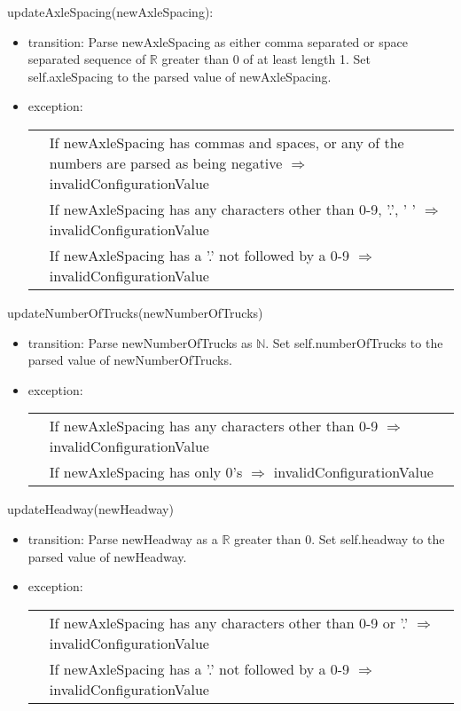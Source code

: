 \documentclass[12pt, titlepage]{article}
\begin{document}
\noindent updateAxleSpacing(newAxleSpacing):
\begin{itemize}
\item transition: Parse newAxleSpacing as either comma separated or space separated sequence of $\mathbb{R}$ greater than 0 of at least length 1. Set self.axleSpacing to the parsed value of newAxleSpacing.
\item exception:\\
  \begin{tabular}{p{1cm} p{16.3cm}}
    & If newAxleSpacing has commas and spaces, or any of the numbers are parsed as being negative $\Rightarrow$ invalidConfigurationValue \\
    & If newAxleSpacing has any characters other than 0-9, '.', ' ' $\Rightarrow$ invalidConfigurationValue \\
    & If newAxleSpacing has a '.' not followed by a 0-9 $\Rightarrow$ invalidConfigurationValue \\
  \end{tabular}
\end{itemize}

\noindent updateNumberOfTrucks(newNumberOfTrucks)
\begin{itemize}
\item transition: Parse newNumberOfTrucks as $\mathbb{N}$. Set self.numberOfTrucks to the parsed value of newNumberOfTrucks.
\item exception:\\
  \begin{tabular}{p{1cm} p{16cm}}
    & If newAxleSpacing has any characters other than 0-9 $\Rightarrow$ invalidConfigurationValue \\
    & If newAxleSpacing has only 0's  $\Rightarrow$ invalidConfigurationValue \\
  \end{tabular}
\end{itemize}

\noindent updateHeadway(newHeadway)
\begin{itemize}
\item transition: Parse newHeadway as a $\mathbb{R}$ greater than 0. Set self.headway to the parsed value of newHeadway.
\item exception:\\
  \begin{tabular}{p{1cm} p{16.3cm}}
    & If newAxleSpacing has any characters other than 0-9 or '.' $\Rightarrow$ invalidConfigurationValue \\
    & If newAxleSpacing has a '.' not followed by a 0-9 $\Rightarrow$ invalidConfigurationValue \\
  \end{tabular}
\end{itemize}
\end{document}
